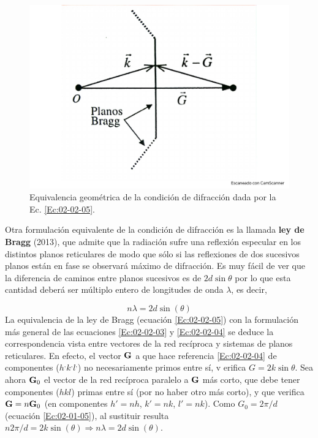 \begin{figure}[h!] \centering
    \includegraphics[scale=0.35]{Cuerpo/Ch_02/Fotos_libro 5.pdf}
    \caption{Equivalencia geométrica de la condición de difracción dada por la Ec. \ref{Ec:02-02-05}.}
    \label{Fig:02-05}
\end{figure}

Otra formulación equivalente de la condición de difracción es la llamada \textbf{ley de Bragg} (2013), que admite que la radiación sufre una reflexión especular en los distintos planos reticulares de modo que sólo si las reflexiones de dos sucesivos planos están en fase se observará máximo de difracción. Es muy fácil de ver que la diferencia de caminos entre planos sucesivos es de $2d\sin \theta$ por lo que esta cantidad deberá ser múltiplo entero de longitudes de onda $\lambda$, es decir,

\begin{equation}
    n \lambda = 2 d \sin (\theta) \label{Ec:02-02-05}
\end{equation}
La equivalencia de la ley de Bragg (ecuación \ref{Ec:02-02-05}) con la formulación más general de las ecuaciones \ref{Ec:02-02-03} y \ref{Ec:02-02-04} se deduce  la correspondencia vista entre vectores de la red recíproca y sistemas de planos reticulares. En efecto, el vector $\mathbf{G}$ a que hace referencia \ref{Ec:02-02-04} de componentes ($h^, k^, l^,$) no necesariamente primos entre sí, v erifica $G=2k\sin \theta$. Sea ahora $\mathbf{G}_0$ el vector de la red recíproca paralelo a $\mathbf{G}$ más corto, que debe tener componentes ($hkl$) primas entre sí (por no haber otro más corto), y que verifica $\mathbf{G} = n \mathbf{G}_0$ (en componentes $h'=nh$, $k'=nk$, $l'=nk$). Como $G_0 = 2\pi/d$ (ecuación \ref{Ec:02-01-05}), al sustituir resulta $n2\pi/d=2k\sin (\theta) \Rightarrow n \lambda = 2 d \sin (\theta)$. 

